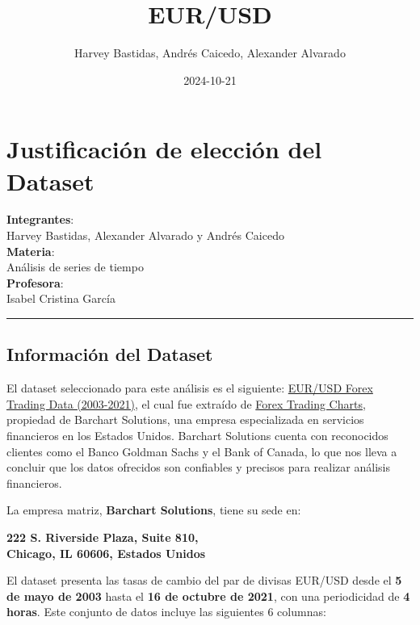 \documentclass[
]{book}
\title{EUR/USD}
\author{Harvey Bastidas, Andrés Caicedo, Alexander Alvarado}
\date{2024-10-21}
\begin{document}
\maketitle

{
\setcounter{tocdepth}{1}
\tableofcontents
}
\chapter{Justificación de elección del Dataset}\label{justificaciuxf3n-de-elecciuxf3n-del-dataset}

\textbf{Integrantes}:\\
Harvey Bastidas, Alexander Alvarado y Andrés Caicedo\\
\textbf{Materia}:\\
Análisis de series de tiempo\\
\textbf{Profesora}:\\
Isabel Cristina García

\begin{center}\rule{0.5\linewidth}{0.5pt}\end{center}

\section{Información del Dataset}\label{informaciuxf3n-del-dataset}

El dataset seleccionado para este análisis es el siguiente: \href{https://www.kaggle.com/datasets/chandrimad31/eurusd-forex-trading-data-20032021}{EUR/USD Forex Trading Data (2003-2021)}, el cual fue extraído de \href{https://forex.tradingcharts.com/}{Forex Trading Charts}, propiedad de Barchart Solutions, una empresa especializada en servicios financieros en los Estados Unidos. Barchart Solutions cuenta con reconocidos clientes como el Banco Goldman Sachs y el Bank of Canada, lo que nos lleva a concluir que los datos ofrecidos son confiables y precisos para realizar análisis financieros.

La empresa matriz, \textbf{Barchart Solutions}, tiene su sede en:

\textbf{222 S. Riverside Plaza, Suite 810,\\
Chicago, IL 60606, Estados Unidos}

El dataset presenta las tasas de cambio del par de divisas EUR/USD desde el \textbf{5 de mayo de 2003} hasta el \textbf{16 de octubre de 2021}, con una periodicidad de \textbf{4 horas}. Este conjunto de datos incluye las siguientes 6 columnas:
\end{document}
